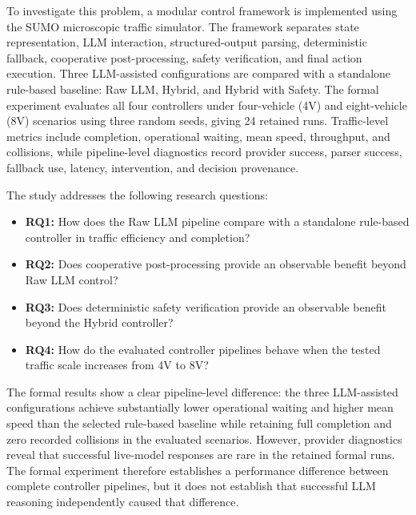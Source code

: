 \documentclass[letterpaper,10pt,conference]{ieeeconf}
\begin{document}
To investigate this problem, a modular control framework is implemented using the SUMO microscopic traffic simulator. The framework separates state representation, LLM interaction, structured-output parsing, deterministic fallback, cooperative post-processing, safety verification, and final action execution. Three LLM-assisted configurations are compared with a standalone rule-based baseline: Raw LLM, Hybrid, and Hybrid with Safety. The formal experiment evaluates all four controllers under four-vehicle (4V) and eight-vehicle (8V) scenarios using three random seeds, giving 24 retained runs. Traffic-level metrics include completion, operational waiting, mean speed, throughput, and collisions, while pipeline-level diagnostics record provider success, parser success, fallback use, latency, intervention, and decision provenance.



The study addresses the following research questions:



\begin{itemize}

    \item \textbf{RQ1:} How does the Raw LLM pipeline compare with a standalone rule-based controller in traffic efficiency and completion?

    \item \textbf{RQ2:} Does cooperative post-processing provide an observable benefit beyond Raw LLM control?

    \item \textbf{RQ3:} Does deterministic safety verification provide an observable benefit beyond the Hybrid controller?

    \item \textbf{RQ4:} How do the evaluated controller pipelines behave when the tested traffic scale increases from 4V to 8V?

\end{itemize}



The formal results show a clear pipeline-level difference: the three LLM-assisted configurations achieve substantially lower operational waiting and higher mean speed than the selected rule-based baseline while retaining full completion and zero recorded collisions in the evaluated scenarios. However, provider diagnostics reveal that successful live-model responses are rare in the retained formal runs. The formal experiment therefore establishes a performance difference between complete controller pipelines, but it does not establish that successful LLM reasoning independently caused that difference.
\end{document}
